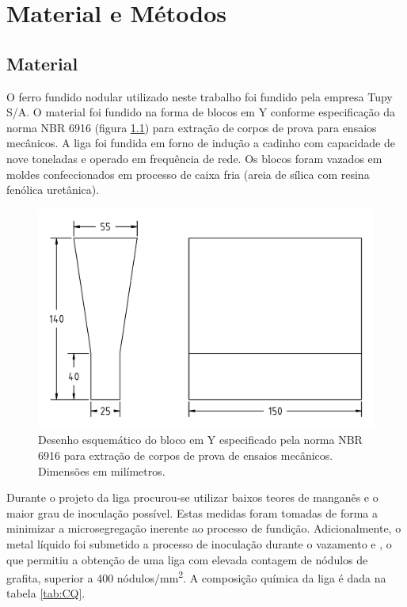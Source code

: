 \chapter{Material e M\'{e}todos}

\section{Material}

O ferro fundido nodular utilizado neste trabalho foi fundido pela empresa Tupy S/A. O material foi fundido na forma de blocos em Y conforme especificação da norma NBR 6916 (figura \ref{fig:nbr6916}) para extração de corpos de prova para ensaios mecânicos. A liga foi fundida em forno de indução a cadinho com capacidade de nove toneladas e operado em frequência de rede. Os blocos foram vazados em moldes confeccionados em processo de caixa fria (areia de sílica com resina fenólica uretânica).

\begin{figure}
	\includegraphics[width=12cm]{img/nbr6916.pdf}
	\caption{Desenho esquemático do bloco em Y especificado pela norma NBR 6916 para extração de corpos de prova de ensaios mecânicos. Dimensões em milímetros.}
	\label{fig:nbr6916}
\end{figure}

Durante o projeto da liga procurou-se utilizar baixos teores de manganês e o maior grau de inoculação possível. Estas medidas foram tomadas de forma a minimizar a microsegregação inerente ao processo de fundição. Adicionalmente, o metal líquido foi submetido a processo de inoculação durante o vazamento e , o que permitiu a obtenção de uma liga com elevada contagem de nódulos de grafita, superior a 400 nódulos/mm\textsuperscript{2}. A composição química da liga é dada na tabela \ref{tab:CQ}. %

